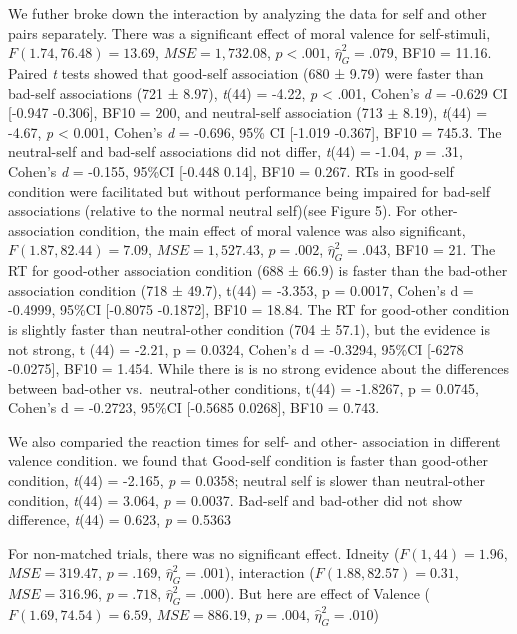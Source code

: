 \documentclass[man]{apa6}
\begin{document}
We futher broke down the interaction by analyzing the data for self and other pairs separately. There was a significant effect of moral valence for self-stimuli, \(F(1.74, 76.48) = 13.69\), \(\mathit{MSE} = 1,732.08\), \(p < .001\), \(\hat{\eta}^2_G = .079\), BF10 = 11.16. Paired \emph{t} tests showed that good-self association (680 ± 9.79) were faster than bad-self associations (721 ± 8.97), \emph{t}(44) = -4.22, \emph{p} \textless{} .001, Cohen's \emph{d} = -0.629 CI {[}-0.947 -0.306{]}, BF10 = 200, and neutral-self association (713 \(\pm\) 8.19), \emph{t}(44) = -4.67, \emph{p} \textless{} 0.001, Cohen's \emph{d} = -0.696, 95\% CI {[}-1.019 -0.367{]}, BF10 = 745.3. The neutral-self and bad-self associations did not differ, \emph{t}(44) = -1.04, \emph{p} = .31, Cohen's \emph{d} = -0.155, 95\%CI {[}-0.448 0.14{]}, BF10 = 0.267. RTs in good-self condition were facilitated but without performance being impaired for bad-self associations (relative to the normal neutral self)(see Figure 5).
For other-association condition, the main effect of moral valence was also significant, \(F(1.87, 82.44) = 7.09\), \(\mathit{MSE} = 1,527.43\), \(p = .002\), \(\hat{\eta}^2_G = .043\), BF10 = 21. The RT for good-other association condition (688 ± 66.9) is faster than the bad-other association condition (718 ± 49.7), t(44) = -3.353, p = 0.0017, Cohen's d = -0.4999, 95\%CI {[}-0.8075 -0.1872{]}, BF10 = 18.84. The RT for good-other condition is slightly faster than neutral-other condition (704 ± 57.1), but the evidence is not strong, t (44) = -2.21, p = 0.0324, Cohen's d = -0.3294, 95\%CI {[}-6278 -0.0275{]}, BF10 = 1.454. While there is is no strong evidence about the differences between bad-other vs.~neutral-other conditions, t(44) = -1.8267, p = 0.0745, Cohen's d = -0.2723, 95\%CI {[}-0.5685 0.0268{]}, BF10 = 0.743.

We also comparied the reaction times for self- and other- association in different valence condition. we found that Good-self condition is faster than good-other condition, \emph{t}(44) = -2.165, \emph{p} = 0.0358; neutral self is slower than neutral-other condition, \emph{t}(44) = 3.064, \emph{p} = 0.0037. Bad-self and bad-other did not show difference, \emph{t}(44) = 0.623, \emph{p} = 0.5363

For non-matched trials, there was no significant effect. Idneity (\(F(1, 44) = 1.96\), \(\mathit{MSE} = 319.47\), \(p = .169\), \(\hat{\eta}^2_G = .001\)), interaction (\(F(1.88, 82.57) = 0.31\), \(\mathit{MSE} = 316.96\), \(p = .718\), \(\hat{\eta}^2_G = .000\)). But here are effect of Valence (\(F(1.69, 74.54) = 6.59\), \(\mathit{MSE} = 886.19\), \(p = .004\), \(\hat{\eta}^2_G = .010\))
\end{document}
